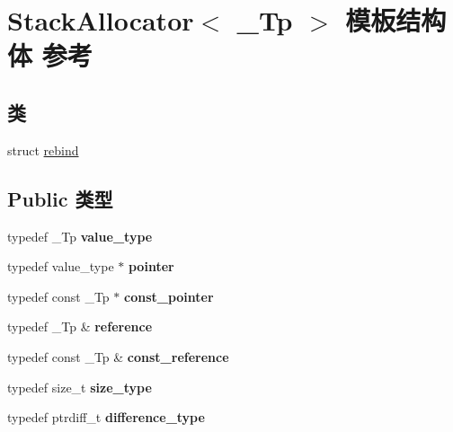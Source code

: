 \hypertarget{struct_stack_allocator}{}\section{Stack\+Allocator$<$ \+\_\+\+Tp $>$ 模板结构体 参考}
\label{struct_stack_allocator}
\subsection*{类}
\begin{DoxyCompactItemize}
\item 
struct \hyperlink{struct_stack_allocator_1_1rebind}{rebind}
\end{DoxyCompactItemize}
\subsection*{Public 类型}
\begin{DoxyCompactItemize}
\item 
\mbox{\label{struct_stack_allocator_ae216ac1269940a86db58fc6037b75a1e}} 
typedef \+\_\+\+Tp {\bfseries value\+\_\+type}
\item 
\mbox{\label{struct_stack_allocator_aafa22044639f5186d4dcf6742cd6d645}} 
typedef value\+\_\+type $\ast$ {\bfseries pointer}
\item 
\mbox{\label{struct_stack_allocator_a1db3ede34bae31b732c279bb36e711f2}} 
typedef const \+\_\+\+Tp $\ast$ {\bfseries const\+\_\+pointer}
\item 
\mbox{\label{struct_stack_allocator_a9f6170c482a7b3e9d0696541bc091a71}} 
typedef \+\_\+\+Tp \& {\bfseries reference}
\item 
\mbox{\label{struct_stack_allocator_a5b36a7ac0898708660736d21af48a5fa}} 
typedef const \+\_\+\+Tp \& {\bfseries const\+\_\+reference}
\item 
\mbox{\label{struct_stack_allocator_a0fcb34ee22f22a115f1021b99132a668}} 
typedef size\+\_\+t {\bfseries size\+\_\+type}
\item 
\mbox{\label{struct_stack_allocator_a8e83289e3bc77806fbc175d098a06d6e}} 
typedef ptrdiff\+\_\+t {\bfseries difference\+\_\+type}
\end{DoxyCompactItemize}
